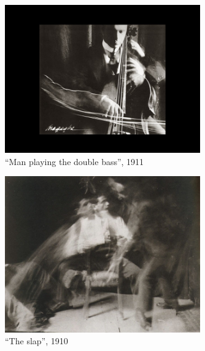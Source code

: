\documentclass[
  french,
]{book}
\begin{document}
\begin{figure}
\centering
\includegraphics[width=0.75\textwidth,height=\textheight]{medias/corpus/bragaglia/Anton-Giulio-Bragaglia-fotodinamica-02.jpg}
\caption{``Man playing the double bass'', 1911}
\end{figure}

\begin{figure}
\centering
\includegraphics[width=0.75\textwidth,height=\textheight]{medias/corpus/bragaglia/Anton-Giulio-Bragaglia-fotodinamica-04.jpg}
\caption{``The slap'', 1910}
\end{figure}
\end{document}
